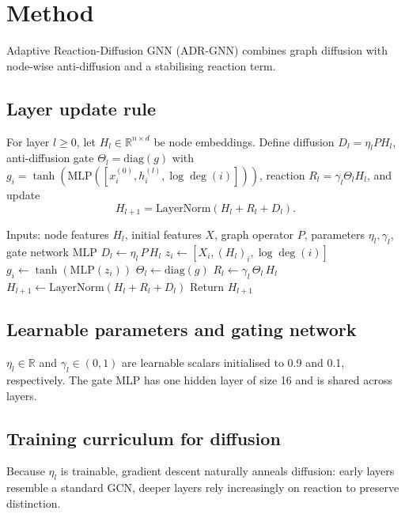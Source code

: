 \documentclass{article}
\begin{document}
\section{Method}
Adaptive Reaction-Diffusion GNN (ADR-GNN) combines graph diffusion with node-wise anti-diffusion and a stabilising reaction term.

\subsection{Layer update rule}
For layer \(l \ge 0\), let \(H_l \in \mathbb{R}^{n\times d}\) be node embeddings. Define diffusion \(D_l = \eta_l P H_l\), anti-diffusion gate \(\Theta_l = \mathrm{diag}(g)\) with \(g_i = \tanh(\mathrm{MLP}([x^{(0)}_i, h^{(l)}_i, \log \deg(i)]))\), reaction \(R_l = \gamma_l \Theta_l H_l\), and update
\[ H_{l+1} = \mathrm{LayerNorm}(H_l + R_l + D_l). \]

\begin{algorithm}[H]
\caption{ADR-GNN Layer Forward Pass}
\begin{algorithmic}
\State Inputs: node features \(H_l\), initial features \(X\), graph operator \(P\), parameters \(\eta_l, \gamma_l\), gate network MLP
\State \(D_l \leftarrow \eta_l\, P\, H_l\)
  \State \(z_i \leftarrow [X_i, (H_l)_i, \log \deg(i)]\)
  \State \(g_i \leftarrow \tanh(\mathrm{MLP}(z_i))\)
\EndFor
\State \(\Theta_l \leftarrow \mathrm{diag}(g)\)
\State \(R_l \leftarrow \gamma_l\, \Theta_l\, H_l\)
\State \(H_{l+1} \leftarrow \mathrm{LayerNorm}(H_l + R_l + D_l)\)
\State Return \(H_{l+1}\)
\end{algorithmic}
\end{algorithm}

\subsection{Learnable parameters and gating network}
\(\eta_l \in \mathbb{R}\) and \(\gamma_l \in (0,1)\) are learnable scalars initialised to 0.9 and 0.1, respectively. The gate MLP has one hidden layer of size 16 and is shared across layers.

\subsection{Training curriculum for diffusion}
Because \(\eta_l\) is trainable, gradient descent naturally anneals diffusion: early layers resemble a standard GCN, deeper layers rely increasingly on reaction to preserve distinction.
\end{document}
